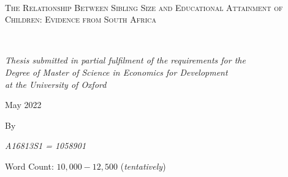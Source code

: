\begin{titlepage}
	\centering
	\vspace*{1.5cm}
	\hrulefill\\
	\vspace{0.5cm}
	{\scshape\LARGE The Relationship Between Sibling Size and Educational Attainment of Children: Evidence from South Africa\par}
	\vspace{0.5cm}
	\hrulefill\\
	\vspace{1.5cm}

	{\normalsize\itshape Thesis submitted in partial fulfilment of the requirements for the\\
Degree of Master of Science in Economics for Development\\
at the University of Oxford\par}
	
	\vspace{0.6cm}

	\vspace{2.8cm}
	{\normalsize May 2022 \par}
	
	
	\vspace{1.2cm}
	{\normalsize By \par}
	
	\vspace{1.2cm}
	{\large\itshape A16813S1 = 1058901}
	
	
	\vspace{2.5cm}
	{\normalsize Word Count: $ 10,000 - 12,500 $ (\textit{tentatively})}


\end{titlepage}